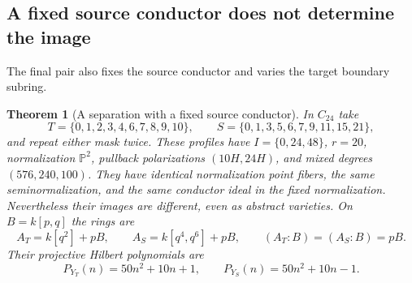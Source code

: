 \documentclass[10pt,fleqn]{article}
\numberwithin{equation}{section}
\newtheorem{theorem}{Theorem}[section]
\newcommand{\PP}{\mathbb P}
\begin{document}
\subsection{A fixed source conductor does not determine the image}
\label{r24:separation:fixed-conductor}

The final pair also fixes the source conductor and varies the target
boundary subring.

\begin{theorem}[A separation with a fixed source conductor]
\label{v7:cond:same-ideal}
In $C_{24}$ take
\[
 T=\{0,1,2,3,4,6,7,8,9,10\},\qquad
 S=\{0,1,3,5,6,7,9,11,15,21\},
\]
and repeat either mask twice.  These profiles have $I=\{0,24,48\}$,
$r=20$, normalization $\PP^2$, pullback polarizations $(10H,24H)$,
and mixed degrees $(576,240,100)$.
They have identical normalization point fibers, the same
seminormalization, and the same conductor ideal in the fixed
normalization.  Nevertheless their images are different, even as
abstract varieties.  On $B=k[p,q]$ the rings are
\[
 A_T=k[q^2]+pB,\qquad A_S=k[q^4,q^6]+pB,
 \qquad(A_T:B)=(A_S:B)=pB.
\]
Their projective Hilbert polynomials are
\[
 P_{Y_T}(n)=50n^2+10n+1,\qquad
 P_{Y_S}(n)=50n^2+10n-1.
\]
\end{theorem}
\end{document}
